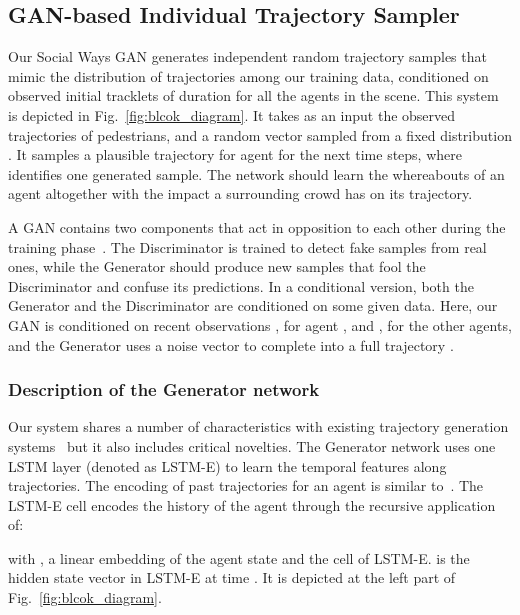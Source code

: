 \documentclass[10pt,twocolumn,letterpaper]{article}
\begin{document}
\vspace{-0.1cm}
\subsection{GAN-based Individual Trajectory Sampler}
\label{subsec:GAN}

Our Social Ways GAN generates independent random trajectory samples that mimic the distribution of trajectories among our training data, conditioned on observed initial tracklets of duration  for all the agents in the scene. This system is depicted in Fig.~\ref{fig:blcok_diagram}. It takes as an input the observed trajectories of  pedestrians,  and a random vector  sampled from a fixed distribution . It samples a plausible trajectory  for agent  for the next  time steps, where  identifies one generated sample. The network should learn the whereabouts of an agent altogether with the impact a surrounding crowd has on its trajectory.

A GAN contains two components that act in opposition to each other during the training phase~\cite{Goodfellow2014}. The Discriminator  is trained to detect fake samples from real ones, while the Generator  should produce new samples that fool the Discriminator and confuse its predictions. In a conditional version, both the Generator and the Discriminator are conditioned on some given data. Here, our GAN is conditioned on recent observations  , for agent , and  , for the other agents, and the Generator uses a noise vector  to complete  into a full trajectory .

\vspace{-0.3cm}
\subsubsection{Description of the Generator network}


Our system shares a number of characteristics with existing trajectory generation systems~\cite{SocialGAN2018,SoPhie2018} but it also includes critical novelties. The Generator network uses one LSTM layer (denoted as LSTM-E) to learn the temporal features along trajectories.  The encoding of past trajectories  for an agent is similar to~\cite{SocialGAN2018}. The LSTM-E cell encodes the history of the agent  through the recursive application of:

\vspace{-0.2cm}

with ,  a linear embedding of the agent state and  the cell of LSTM-E.  is the hidden state vector in LSTM-E at time . It is depicted at the left part of Fig.~\ref{fig:blcok_diagram}.
\end{document}
